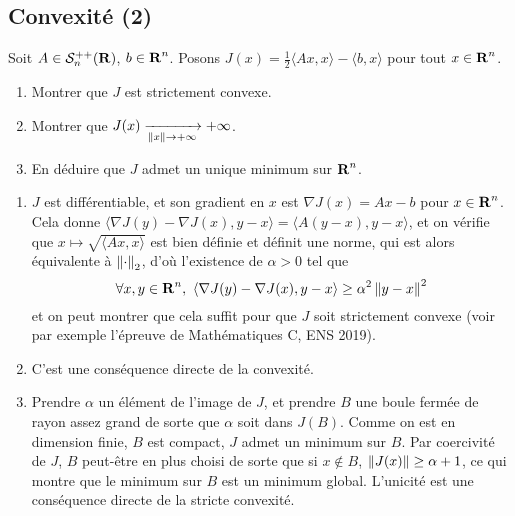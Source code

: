 \begin{correction}
	[À rédiger]
\end{correction}

\subsection{Convexité (2)}
\begin{exercice}
	Soit $A\in\mathcal S_n^{++}(\operatorname{\mathbf{R}})$, $b\in\operatorname{\mathbf{R}}^n$.
	Posons $J(x)=\frac12\langle Ax,x\rangle - \langle b,x\rangle$ pour tout $x\in\operatorname{\mathbf{R}}^n$.
	\begin{enumerate}
		\item Montrer que $J$ est strictement convexe.
		\item Montrer que $J(x)\xrightarrow[\left\lVert x\right\rVert\to+\infty]{}+\infty$.
		\item En déduire que $J$ admet un unique minimum sur $\operatorname{\mathbf{R}}^n$.
	\end{enumerate}
\end{exercice}

\begin{correction}
	\begin{enumerate}
		\item $J$ est différentiable, et son gradient en $x$ est $\nabla J(x)=Ax-b$ pour $x\in \operatorname{\mathbf{R}}^n$.
		Cela donne $\langle \nabla J(y)-\nabla J(x),y-x\rangle=\langle A(y-x),y-x\rangle$, et on vérifie que $x\mapsto\sqrt{\langle Ax,x\rangle}$ est bien définie et définit une norme,
		qui est alors équivalente à $\left\lVert \cdot\right\rVert_2$, d'où l'existence de $\alpha >0$ tel que 
		\[
			\forall x,y\in\operatorname{\mathbf{R}}^n,\ \langle \nabla J(y)-\nabla J(x),y-x\rangle\geq\alpha^2\left\lVert y-x\right\rVert^2
		\]
		et on peut montrer que cela suffit pour que $J$ soit strictement convexe (voir par exemple l'épreuve de Mathématiques C, ENS 2019).
		\item C'est une conséquence directe de la convexité.
		\item Prendre $\alpha$ un élément de l'image de $J$, et prendre $B$ une boule fermée de rayon assez grand de sorte que $\alpha$ soit dans $J(B)$.
		Comme on est en dimension finie, $B$ est compact, $J$ admet un minimum sur $B$.
		Par coercivité de $J$, $B$ peut-être en plus choisi de sorte que si $x\notin B$, $\left\lVert J(x)\right\rVert\geq\alpha+1$, ce qui montre que le minimum sur $B$ est un minimum global.
		L'unicité est une conséquence directe de la stricte convexité.
	\end{enumerate}
\end{correction}


